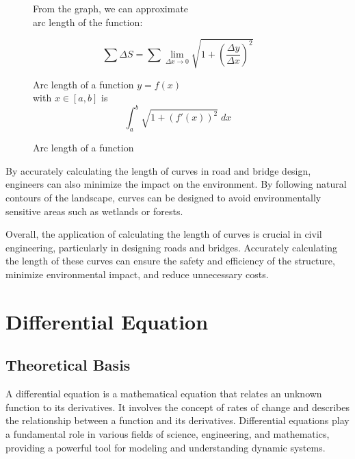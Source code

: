 \documentclass[13pt,a4paper]{report}
\begin{document}
\begin{figure}[ht]
\begin{minipage}{0.45\textwidth}
{}
\vspace{-1cm}
\caption{Arc length of a function}
\end{minipage}
\hfill
\begin{minipage}{0.45\textwidth}
\centering

From the graph, we can approximate\\
arc length of the function:

$$\sum \Delta S=\sum\lim_{\Delta x\rightarrow 0} \sqrt{1+\left(\dfrac{\Delta y}{\Delta x}\right)^2}$$

\vspace{0.3cm}

Arc length of a function $y=f(x)$\\
with $x\in[a,b]$ is
$$\int_a^b \sqrt{1+(f'(x))^2}\;dx$$
\end{minipage}
\end{figure}

By accurately calculating the length of curves in road and bridge design, engineers can also minimize the impact on the environment. By following natural contours of the landscape, curves can be designed to avoid environmentally sensitive areas such as wetlands or forests.

Overall, the application of calculating the length of curves is crucial in civil engineering, particularly in designing roads and bridges. Accurately calculating the length of these curves can ensure the safety and efficiency of the structure, minimize environmental impact, and reduce unnecessary costs.




\newpage
\section{Differential Equation}
\subsection{Theoretical Basis}
A differential equation is a mathematical equation that relates an unknown function to its derivatives. It involves the concept of rates of change and describes the relationship between a function and its derivatives. Differential equations play a fundamental role in various fields of science, engineering, and mathematics, providing a powerful tool for modeling and understanding dynamic systems.
\end{document}
